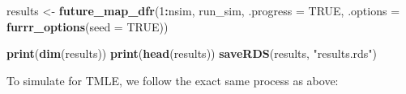 \documentclass[
]{article}
\newenvironment{Shaded}{\begin{snugshade}}{\end{snugshade}}
\newcommand{\AttributeTok}[1]{\textcolor[rgb]{0.13,0.29,0.53}{#1}}
\newcommand{\ConstantTok}[1]{\textcolor[rgb]{0.56,0.35,0.01}{#1}}
\newcommand{\DecValTok}[1]{\textcolor[rgb]{0.00,0.00,0.81}{#1}}
\newcommand{\FunctionTok}[1]{\textcolor[rgb]{0.13,0.29,0.53}{\textbf{#1}}}
\newcommand{\NormalTok}[1]{#1}
\newcommand{\OtherTok}[1]{\textcolor[rgb]{0.56,0.35,0.01}{#1}}
\newcommand{\SpecialCharTok}[1]{\textcolor[rgb]{0.81,0.36,0.00}{\textbf{#1}}}
\newcommand{\StringTok}[1]{\textcolor[rgb]{0.31,0.60,0.02}{#1}}
\begin{document}
\begin{Shaded}
\begin{Highlighting}[]
\NormalTok{results }\OtherTok{\textless{}{-}} \FunctionTok{future\_map\_dfr}\NormalTok{(}\DecValTok{1}\SpecialCharTok{:}\NormalTok{nsim, run\_sim,}
                          \AttributeTok{.progress =} \ConstantTok{TRUE}\NormalTok{,}
                          \AttributeTok{.options =} \FunctionTok{furrr\_options}\NormalTok{(}\AttributeTok{seed =} \ConstantTok{TRUE}\NormalTok{))}

\FunctionTok{print}\NormalTok{(}\FunctionTok{dim}\NormalTok{(results))         }
\FunctionTok{print}\NormalTok{(}\FunctionTok{head}\NormalTok{(results))        }
\FunctionTok{saveRDS}\NormalTok{(results, }\StringTok{"results.rds"}\NormalTok{)}
\end{Highlighting}
\end{Shaded}

To simulate for TMLE, we follow the exact same process as above:
\end{document}
